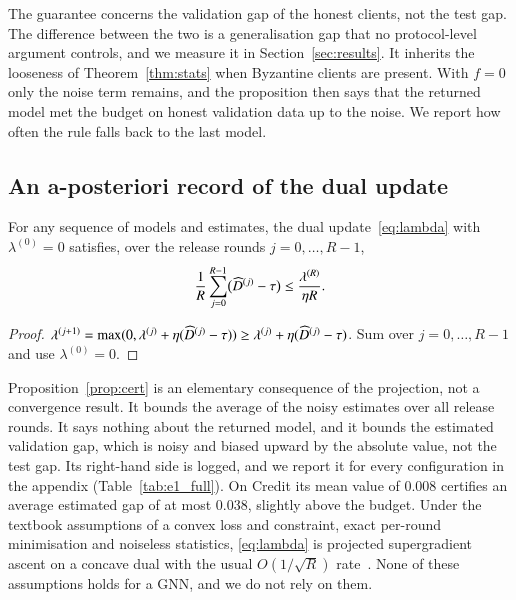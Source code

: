 The guarantee concerns the validation gap of the honest clients, not the test gap. The difference between the two is a generalisation gap that no protocol-level argument controls, and we measure it in Section~\ref{sec:results}. It inherits the looseness of Theorem~\ref{thm:stats} when Byzantine clients are present. With $f=0$ only the noise term remains, and the proposition then says that the returned model met the budget on honest validation data up to the noise. We report how often the rule falls back to the last model.

\subsection{An a-posteriori record of the dual update}

\begin{proposition}\label{prop:cert}
For any sequence of models and estimates, the dual update~\eqref{eq:lambda} with $\lambda^{(0)}=0$ satisfies, over the release rounds $j=0,\dots,R-1$,
\begin{equation}\label{eq:cert}
\frac{1}{R}\sum_{j=0}^{R-1}\bigl(\widehat{D}^{(j)}-\tau\bigr)\le\frac{\lambda^{(R)}}{\eta R}.
\end{equation}
\end{proposition}

\begin{proof}
$\lambda^{(j+1)}=\max(0,\lambda^{(j)}+\eta(\widehat{D}^{(j)}-\tau))\ge\lambda^{(j)}+\eta(\widehat{D}^{(j)}-\tau)$. Sum over $j=0,\dots,R-1$ and use $\lambda^{(0)}=0$.
\end{proof}

Proposition~\ref{prop:cert} is an elementary consequence of the projection, not a convergence result. It bounds the average of the noisy estimates over all release rounds. It says nothing about the returned model, and it bounds the estimated validation gap, which is noisy and biased upward by the absolute value, not the test gap. Its right-hand side is logged, and we report it for every \clamp{} configuration in the appendix (Table~\ref{tab:e1_full}). On Credit its mean value of 0.008 certifies an average estimated gap of at most 0.038, slightly above the budget. Under the textbook assumptions of a convex loss and constraint, exact per-round minimisation and noiseless statistics, \eqref{eq:lambda} is projected supergradient ascent on a concave dual with the usual $O(1/\sqrt{R})$ rate~\citep{cotter2019optimization}. None of these assumptions holds for a GNN, and we do not rely on them.
